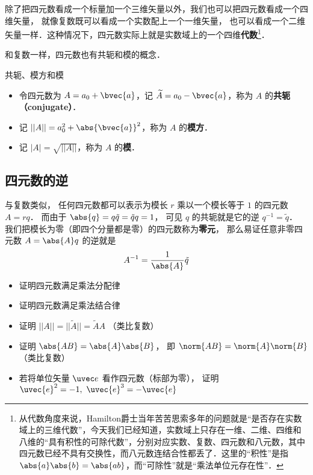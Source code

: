 除了把四元数看成一个标量加一个三维矢量以外，我们也可以把四元数看成一个四维矢量， 就像复数既可以看成一个实数配上一个一维矢量， 也可以看成一个二维矢量一样．这种情况下，四元数实际上就是实数域上的一个四维\textbf{代数}\footnote{从代数角度来说，Hamilton爵士当年苦苦思索多年的问题就是“是否存在实数域上的三维代数”，今天我们已经知道，实数域上只存在一维、二维、四维和八维的“具有积性的可除代数”，分别对应实数、复数、四元数和八元数，其中四元数已经不具有交换性，而八元数连结合性都丢了．这里的“积性”是指 $\abs{a}\abs{b}=\abs{ab}$，而“可除性”就是“乘法单位元存在性”．}．

和复数一样，四元数也有共轭和模的概念．

\begin{definition}{共轭、模方和模}\label{Quat_def2}
\begin{itemize}
\item 令四元数为 $A=a_0+\bvec{a}$，记 $\widetilde{A}=a_0-\bvec{a}$，称为 $A$ 的\textbf{共轭（conjugate）}．
\item 记 $||A||=a_0^2+ \abs{\bvec{a}}^2$，称为 $A$ 的\textbf{模方}．
\item 记 $|A|=\sqrt{||A||}$，称为 $A$ 的\textbf{模}．
\end{itemize}
\end{definition}

\subsection{四元数的逆}
与复数类似， 任何四元数都可以表示为模长 $r$ 乘以一个模长等于 $1$ 的四元数 $A = r q$． 而由于 $\abs{q} = q\tilde q = \tilde q q = 1$， 可见 $q$ 的共轭就是它的逆 $q^{-1} = \tilde q$． 我们把模长为零（即四个分量都是零）的四元数称为\textbf{零元}， 那么易证任意非零四元数 $A = \abs{A} q$ 的逆就是
\begin{equation}
A^{-1} = \frac{1}{\abs{A}} \tilde q
\end{equation}

\begin{exercise}{}\label{Quat_exe1}
\begin{itemize}
\item 证明四元数满足乘法分配律
\item 证明四元数满足乘法结合律
\item 证明 $||A||=||\widetilde{A}||=\widetilde{A}A$ （类比复数）
\item 证明 $\abs{AB} = \abs{A}\abs{B}$， 即 $\norm{AB} = \norm{A}\norm{B}$ （类比复数）
\item 若将单位矢量 $\uvec e$ 看作四元数（标部为零）， 证明 $\uvec{e}^2=-1,\ \uvec{e}^3=-\uvec{e}$
\end{itemize}
\end{exercise}

